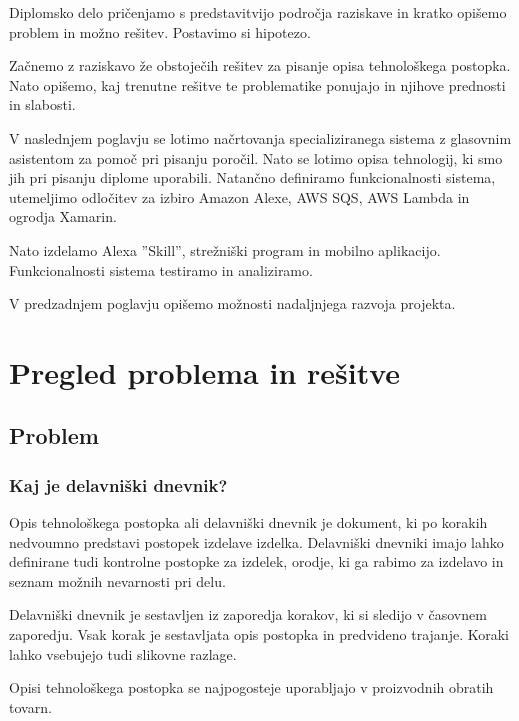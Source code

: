 \documentclass[a4paper, 12pt]{book}
\begin{document}
Diplomsko delo pričenjamo s predstavitvijo področja raziskave in kratko opišemo problem in možno rešitev. 
Postavimo si hipotezo.

Začnemo z raziskavo že obstoječih rešitev za pisanje opisa tehnološkega postopka.
Nato opišemo, kaj trenutne rešitve te problematike ponujajo in njihove prednosti in slabosti.

V naslednjem poglavju se lotimo načrtovanja specializiranega sistema z glasovnim asistentom za pomoč pri pisanju poročil.
Nato se lotimo opisa tehnologij, ki smo jih pri pisanju diplome uporabili.
Natančno definiramo funkcionalnosti sistema, utemeljimo odločitev za izbiro Amazon Alexe, AWS SQS, AWS Lambda in ogrodja Xamarin.

Nato izdelamo Alexa ''Skill'', strežniški program in mobilno aplikacijo.
Funkcionalnosti sistema testiramo in analiziramo.

V predzadnjem poglavju opišemo možnosti nadaljnjega razvoja projekta.

\chapter{Pregled problema in rešitve}

\section{Problem}

\subsection {Kaj je delavniški dnevnik?}

Opis tehnološkega postopka ali delavniški dnevnik je dokument, ki po korakih nedvoumno predstavi postopek izdelave izdelka.
Delavniški dnevniki imajo lahko definirane tudi kontrolne postopke za izdelek, orodje, ki ga rabimo za izdelavo in seznam možnih nevarnosti pri delu.

Delavniški dnevnik je sestavljen iz zaporedja korakov, ki si sledijo v časovnem zaporedju.
Vsak korak je sestavljata opis postopka in predvideno trajanje.
Koraki lahko vsebujejo tudi slikovne razlage.

Opisi tehnološkega postopka se najpogosteje uporabljajo v proizvodnih obratih tovarn.
\end{document}
